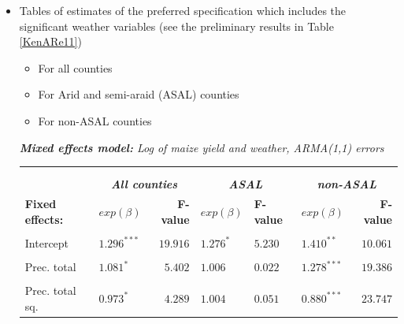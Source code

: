 \documentclass[12pt]{iopart}
\begin{document}
\color{blue}
\begin{itemize}

\item Tables of estimates of the preferred specification which includes the significant weather variables (see the preliminary results in Table \ref{KenARe11}) 

\begin{itemize}
\item For all counties 
\item For Arid and semi-araid (ASAL) counties
\item For non-ASAL counties
\end{itemize}

\color{black}

{
\begin{threeparttable}
\singlespacing
\caption{\textit{\textbf{Mixed  effects model:} Log of maize yield and weather, ARMA(1,1) errors}}
\label{KenARe11} 
\begin{footnotesize}
\begin{tabular}{llrlllr} 
\hline \vspace{-0.2cm} \\
\vspace{-0.2cm} \\
  \multicolumn{1}{l}{\vspace{0.1cm}\textbf{ }}  &\multicolumn{2}{c}{\textit{\textbf{All counties}}} &\multicolumn{2}{c}{\textit{\textbf{ASAL}}} &\multicolumn{2}{c}{\textit{\textbf{non-ASAL}}}\\
    \multicolumn{1}{l}{\vspace{0.1cm}\textbf{Fixed effects:}}&{$exp(\beta)$}&\textbf{F-value\tnote{a}}%
    &{$exp(\beta)$}&\textbf{F-value\tnote{a}}&{$exp(\beta)$}&\textbf{F-value\tnote{a}}\\
 \hline 
\hline
\\
\vspace{-0.2cm}Intercept&$1.296^{***}$&$19.916$&$1.276^{*}$&$5.230$&$1.410^{**}$&$10.061$\\
  \\ \vspace{-0.2cm}Prec. total&$1.081^{*}$&$5.402$&$1.006^{}$&$0.022$&$1.278^{***}$&$19.386$\\
  \\
  \vspace{-0.2cm}Prec. total sq.&$0.973^{*}$&$4.289$&$1.004$&$0.051$&$0.880^{***}$&$23.747$\\

\end{tabular}
\end{footnotesize}
\end{threeparttable}}
\end{itemize}
\end{document}
